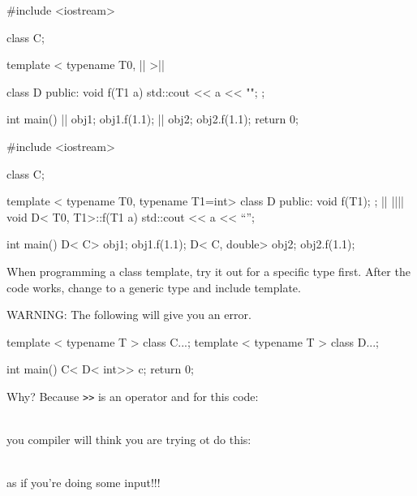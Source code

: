 \begin{consolethree}[escapeinside=||]
#include <iostream>

class C{};

template < typename T0, || >||

class D{
public: void f(T1 a) { std::cout << a << "\n"; }
};

int main()
{    
     || obj1; obj1.f(1.1);
     || obj2; obj2.f(1.1);
     return 0;
}
 
\end{consolethree}

\begin{consolethree}[escapeinside=||]
#include <iostream>

class C{};

template < typename T0, typename T1=int>
class D
{
public: void f(T1);
};
||
||||
void D< T0, T1>::f(T1 a)
{    
     std::cout << a << ``\n'';
}

int main()
{   
     D< C> obj1;
     obj1.f(1.1);
     D< C, double> obj2;
     obj2.f(1.1);
} 
\end{consolethree}

When programming a class template, try it out for a specific type first.
After the code works, change to a generic type and include template.

WARNING: The following will give you an error.

\begin{console}
template < typename T > class C{...};
template < typename T > class D{...};

int main()
{    
     C< D< int>> c;
     return 0;
} 
\end{console}

Why? Because \texttt{>>} is an operator and for
this code:

\\

you compiler will think you are trying ot do this:

\\

as if you're doing some input!!!

